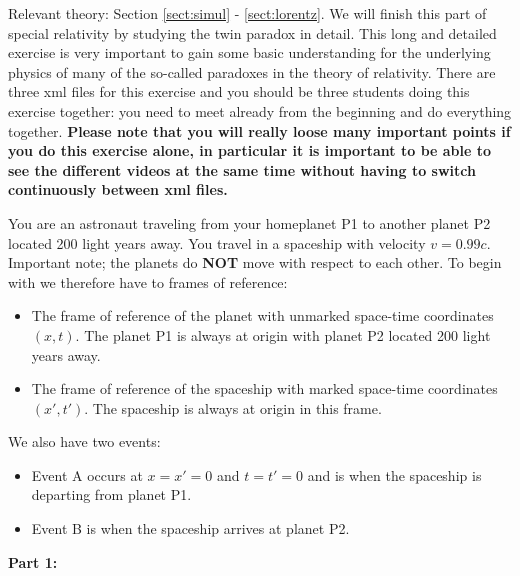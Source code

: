 {\begin{multicols}{2}
\vspace{0.5cm}


Relevant theory: Section \ref{sect:simul} - \ref{sect:lorentz}.\newline
We will finish this part of special relativity by studying the twin paradox in detail. This long and detailed exercise is very important to gain some basic understanding for the underlying physics of many of the so-called paradoxes in the theory of relativity.
There are three xml files for this exercise and you should be three students doing this exercise together: you need to meet already from the beginning and do everything together. {\bf Please note that you will really loose many important points if you do this exercise alone, in particular it is important to be able to see the different videos at the same time without having to switch continuously between xml files.}

You are an astronaut traveling from your homeplanet P1 to another planet P2 located 200 light years away. You travel in a spaceship with velocity $v=0.99c$. Important note; the planets do {\bf NOT} move with respect to each other. To begin with we therefore have to frames of reference:
\begin{itemize}
\item The frame of reference of the planet with unmarked space-time coordinates $(x,t)$. The planet P1 is always at origin with planet P2 located 200 light years away.
\item The frame of reference of the spaceship with marked space-time coordinates $(x',t')$. The spaceship is always at origin in this frame. 
\end{itemize}

We also have two events:
\begin{itemize}
\item Event A occurs at $x=x'=0$ and $t=t'=0$ and is when the spaceship is departing from planet P1.
\item Event B is when the spaceship arrives at planet P2.
\end{itemize}

{\bf Part 1:}


\end{multicols}}
